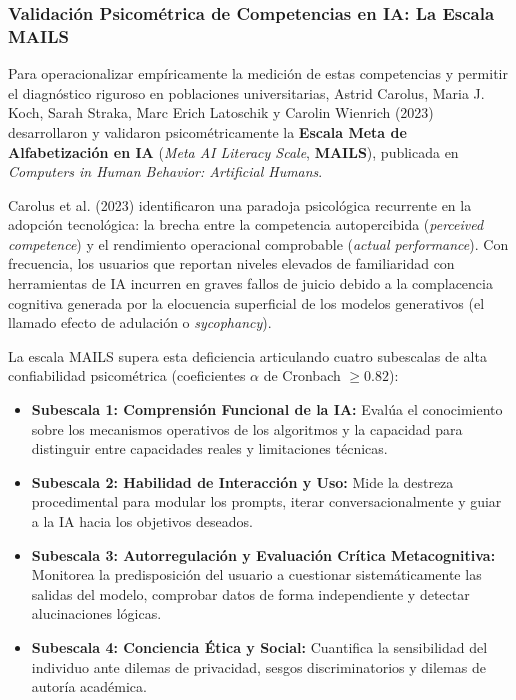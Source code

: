 \subsubsection{Validación Psicométrica de Competencias en IA: La Escala MAILS}

Para operacionalizar empíricamente la medición de estas competencias y permitir el diagnóstico riguroso en poblaciones universitarias, Astrid Carolus, Maria J. Koch, Sarah Straka, Marc Erich Latoschik y Carolin Wienrich (2023) desarrollaron y validaron psicométricamente la \textbf{Escala Meta de Alfabetización en IA} (\textit{Meta AI Literacy Scale}, \textbf{MAILS}), publicada en \textit{Computers in Human Behavior: Artificial Humans}.

Carolus et al. (2023) identificaron una paradoja psicológica recurrente en la adopción tecnológica: la brecha entre la competencia autopercibida (\textit{perceived competence}) y el rendimiento operacional comprobable (\textit{actual performance}). Con frecuencia, los usuarios que reportan niveles elevados de familiaridad con herramientas de IA incurren en graves fallos de juicio debido a la complacencia cognitiva generada por la elocuencia superficial de los modelos generativos (el llamado efecto de adulación o \textit{sycophancy}).

La escala MAILS supera esta deficiencia articulando cuatro subescalas de alta confiabilidad psicométrica (coeficientes $\alpha$ de Cronbach $\ge 0.82$):
\begin{itemize}
    \item \textbf{Subescala 1: Comprensión Funcional de la IA:} Evalúa el conocimiento sobre los mecanismos operativos de los algoritmos y la capacidad para distinguir entre capacidades reales y limitaciones técnicas.
    \item \textbf{Subescala 2: Habilidad de Interacción y Uso:} Mide la destreza procedimental para modular los prompts, iterar conversacionalmente y guiar a la IA hacia los objetivos deseados.
    \item \textbf{Subescala 3: Autorregulación y Evaluación Crítica Metacognitiva:} Monitorea la predisposición del usuario a cuestionar sistemáticamente las salidas del modelo, comprobar datos de forma independiente y detectar alucinaciones lógicas.
    \item \textbf{Subescala 4: Conciencia Ética y Social:} Cuantifica la sensibilidad del individuo ante dilemas de privacidad, sesgos discriminatorios y dilemas de autoría académica.
\end{itemize}

